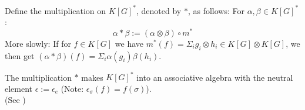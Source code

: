 \begin{definition}
  Define the multiplication on $ K \left\lbrack G \right\rbrack^\ast $, denoted by $\ast$, as follows:  For $\alpha, \beta \in K \left\lbrack G \right\rbrack^\ast$:  
  \begin{equation}
    \alpha \ast \beta := \left( \alpha \otimes \beta \right) \circ m^\ast
  \end{equation}
  More slowly: If for $f \in K \left\lbrack G \right\rbrack$ we have $m^\ast \left( f \right) = \Sigma_i g_i \otimes h_i \in K[G] \otimes K[G]$, we then get $\left( \alpha \ast \beta \right) \left( f \right) = \Sigma_i \alpha \left( g_i \right) \beta \left( h_i \right)$.
\end{definition}
%
%

\begin{proposition}
  The multiplication $\ast$ makes $K \left\lbrack G \right\rbrack^\ast$ into an associative algebra with the neutral element $ \epsilon := \epsilon_e$ (Note: $\epsilon_\sigma \left( f \right) = f \left( \sigma \right)$).\\
  (See \cite[A2.2]{DK15})
\end{proposition}

